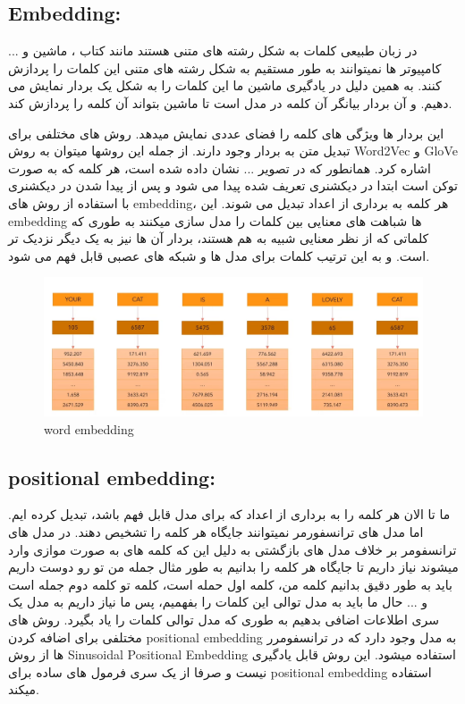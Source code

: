 \subsection{Embedding:}
در زبان طبیعی کلمات به شکل رشته های متنی هستند مانند کتاب ، ماشین و ... 
کامپیوتر ها نمیتوانند به طور مستقیم به شکل رشته های متنی این کلمات را پردازش کنند. 
به همین دلیل در یادگیری ماشین ما این کلمات را به شکل یک بردار نمایش می دهیم. و آن بردار بیانگر آن کلمه در مدل است تا ماشین بتواند آن کلمه را پردازش کند.

این بردار ها ویژگی های کلمه را فضای عددی نمایش میدهد. 
روش های مختلفی برای تبدیل متن به بردار وجود دارند.
از جمله این روشها میتوان به روش Word2Vec و GloVe  اشاره کرد.
همانطور که در تصویر ... نشان داده شده است، هر کلمه که به صورت توکن است ابتدا در دیکشنری تعریف شده پیدا می شود و پس از پیدا شدن در دیکشنری با استفاده از روش های embedding، هر کلمه به برداری از اعداد تبدیل می شوند.
این embedding  ها شباهت های معنایی بین کلمات را مدل سازی میکنند به طوری که کلماتی که از نظر معنایی شبیه به هم هستند، بردار آن ها نیز به یک دیگر نزدیک تر است. و به این ترتیب کلمات برای مدل ها و شبکه های عصبی قابل فهم می شود.



 \begin{figure}[h]
	\centering
	\begin{minipage}[b]{0.7\textwidth}
		\centering
		\includegraphics[width=\textwidth]{transformer_images/word_embedding.png}
		\caption{word embedding}
		\label{fig:word_embedding}
	\end{minipage}
	\hfill
	
\end{figure}



\subsection{positional embedding:}

ما تا الان هر کلمه را به برداری از اعداد که برای مدل قابل فهم باشد، تبدیل کرده ایم. 
اما مدل های ترانسفورمر نمیتوانند جایگاه هر کلمه را تشخیص دهند. در مدل های ترانسفومر بر خلاف مدل های بازگشتی  به دلیل این که کلمه های به صورت موازی وارد میشوند نیاز داریم تا جایگاه هر کلمه را بدانیم به طور مثال جمله من تو رو دوست داریم باید به طور دقیق بدانیم کلمه من، کلمه اول حمله است، کلمه تو کلمه دوم جمله است و ...
حال ما باید به مدل توالی این کلمات را بفهمیم، پس ما نیاز داریم به مدل یک سری اطلاعات اضافی بدهیم به طوری که مدل توالی کلمات را یاد بگیرد. روش های مختلفی برای اضافه کردن positional embedding  به مدل وجود دارد که در ترانسفومرر ها از روش Sinusoidal Positional Embedding استفاده میشود.
این روش قابل یادگیری نیست و صرفا از یک سری فرمول های ساده برای positional embedding  استفاده میکند.

